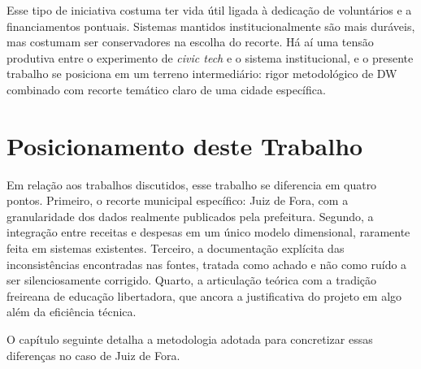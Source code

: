 Esse tipo de iniciativa costuma ter vida útil ligada à dedicação de voluntários e a financiamentos pontuais. Sistemas mantidos institucionalmente são mais duráveis, mas costumam ser conservadores na escolha do recorte. Há aí uma tensão produtiva entre o experimento de \textit{civic tech} e o sistema institucional, e o presente trabalho se posiciona em um terreno intermediário: rigor metodológico de DW combinado com recorte temático claro de uma cidade específica.

\section{Posicionamento deste Trabalho}

Em relação aos trabalhos discutidos, esse trabalho se diferencia em quatro pontos. Primeiro, o recorte municipal específico: Juiz de Fora, com a granularidade dos dados realmente publicados pela prefeitura. Segundo, a integração entre receitas e despesas em um único modelo dimensional, raramente feita em sistemas existentes. Terceiro, a documentação explícita das inconsistências encontradas nas fontes, tratada como achado e não como ruído a ser silenciosamente corrigido. Quarto, a articulação teórica com a tradição freireana de educação libertadora, que ancora a justificativa do projeto em algo além da eficiência técnica.

O capítulo seguinte detalha a metodologia adotada para concretizar essas diferenças no caso de Juiz de Fora.
